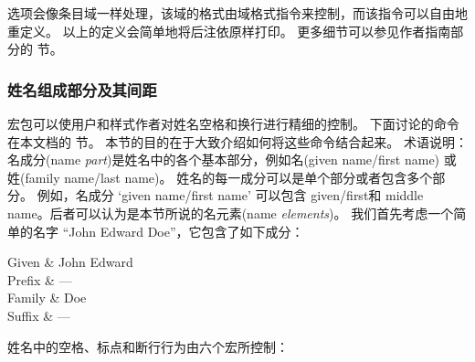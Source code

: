 \begin{ltxexample}
\end{ltxexample}
%
 选项会像条目域一样处理，该域的格式由域格式指令来控制，而该指令可以自由地重定义。
以上的定义会简单地将后注依原样打印。
更多细节可以参见作者指南部分的  节。

\subsubsection{姓名组成部分及其间距}
\label{use:cav:nam}


\biblatex 宏包可以使用户和样式作者对姓名空格和换行进行精细的控制。
下面讨论的命令在本文档的  节。
本节的目的在于大致介绍如何将这些命令结合起来。
术语说明：
名成分(name \emph{part})是姓名中的各个基本部分，例如名(given name/first name) 或姓(family name/last name)。
姓名的每一成分可以是单个部分或者包含多个部分。
例如，名成分 \enquote*{given name/first name} 可以包含 given/first和 middle name。后者可以认为是本节所说的名元素(name \emph{elements})。
我们首先考虑一个简单的名字 \enquote{John Edward Doe}，它包含了如下成分：

\begin{nameparts}
Given	& John Edward \\
Prefix	& --- \\
Family	& Doe \\
Suffix	& --- \\
\end{nameparts}
%
姓名中的空格、标点和断行行为由六个宏所控制：

